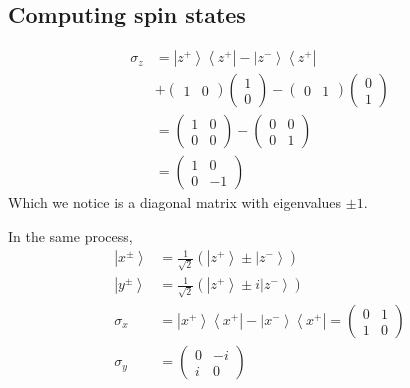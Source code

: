 \documentclass[12pt]{article}
\newcommand{\bra}[1]{\left\langle #1 \right\vert }
\newcommand{\ket}[1]{\left\vert #1 \right\rangle}
\begin{document}
\subsection*{Computing spin states}
\begin{align*}
    \sigma_z &= \ket{z^+} \bra{z^+} - \ket{z^-}\bra{z^+}\\
    &+ \begin{pmatrix}
        1 & 0
    \end{pmatrix}\begin{pmatrix}
        1\\0 
    \end{pmatrix} - \begin{pmatrix}
        0 & 1
    \end{pmatrix} \begin{pmatrix}
        0\\1
    \end{pmatrix}\\
    &= \begin{pmatrix}
        1 & 0\\
        0 & 0
    \end{pmatrix} - \begin{pmatrix}
        0 & 0\\
        0 & 1
    \end{pmatrix}\\
    &= \begin{pmatrix}
        1 & 0\\
        0 & -1
    \end{pmatrix}
\end{align*}
Which we notice is a diagonal matrix with eigenvalues $\pm 1$. 

In the same process, 
\begin{align*}
    \ket{x^\pm} &= \frac{1}{\sqrt 2}(\ket{z^+} \pm \ket{z^-})\\
    \ket{y^\pm} &= \frac{1}{\sqrt 2}(\ket{z^+} \pm i\ket{z^-})\\
    \sigma_x &= \ket{x^+} \bra{x^+} - \ket{x^-}\bra{x^+} = \begin{pmatrix}
        0 & 1\\
        1 & 0
    \end{pmatrix}\\
    \sigma_y &= \begin{pmatrix}
        0 & -i\\
        i & 0
    \end{pmatrix}
\end{align*}
\end{document}
